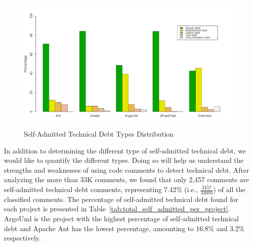 
\begin{figure}[thb!]
  \centering
  \includegraphics[width=1\textwidth]{figures/chapter3/technical_debt_distribution.pdf}
  \caption{Self-Admitted Technical Debt Types Distribution}
  \label{chap3:fig:satd_distribution}
\end{figure}

In addition to determining the different type of self-admitted technical debt, we would like to quantify the different types. Doing so will help us understand the strengths and weaknesses of using code comments to detect technical debt. After analyzing the more than 33K comments, we found that only 2,457 comments are self-admitted technical debt comments, representing 7.42\% (i.e., $\frac{2457}{33093}$) of all the classified comments. The percentage of self-admitted technical debt found for each project is presented in Table~\ref{tab:total_self_admitted_per_project}. ArgoUml is the project with the highest percentage of self-admitted technical debt and Apache Ant has the lowest percentage, amounting to 16.8\% and 3.2\% respectively.

